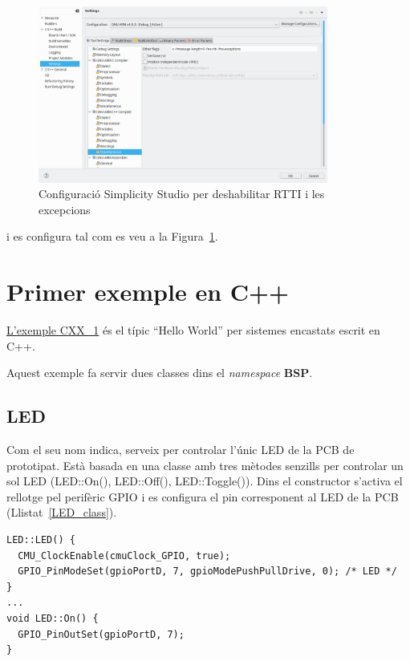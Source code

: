 \begin{figure}
 \centering
\includegraphics[width=0.85\textwidth, keepaspectratio]{imatges/CXX_options.png}
 \caption{Configuració Simplicity Studio per deshabilitar RTTI i les excepcions}
 \label{fig:CXX_RTT}
\end{figure}
i es configura tal com es veu a la Figura~\ref{fig:CXX_RTT}.

\section{Primer exemple en C++}
\label{sec:CXX_example}
\href{https://github.com/mariusmm/cursembedded/tree/master/Simplicity/CXX_1}{L'exemple CXX\_1} és el típic ``Hello World'' per sistemes encastats escrit en C++.

Aquest exemple fa servir dues classes dins el {\em namespace} {\bf BSP}.

\subsection{LED}
Com el seu nom indica, serveix per controlar l'únic \gls{LED} de la \gls{PCB} de prototipat. Està basada en una classe amb tres mètodes senzills per controlar un sol LED (LED::On(), LED::Off(), LED::Toggle()).
Dins el constructor s'activa el rellotge pel perifèric \gls{GPIO} i es configura el pin corresponent al LED de la PCB (Llistat~\ref{LED_class}).

 \begin{lstlisting}[caption={Part del codi de la classe LED},style=customc,label=LED_class]
LED::LED() {
  CMU_ClockEnable(cmuClock_GPIO, true);
  GPIO_PinModeSet(gpioPortD, 7, gpioModePushPullDrive, 0); /* LED */
}
...
void LED::On() {
  GPIO_PinOutSet(gpioPortD, 7);
}
\end{lstlisting}


